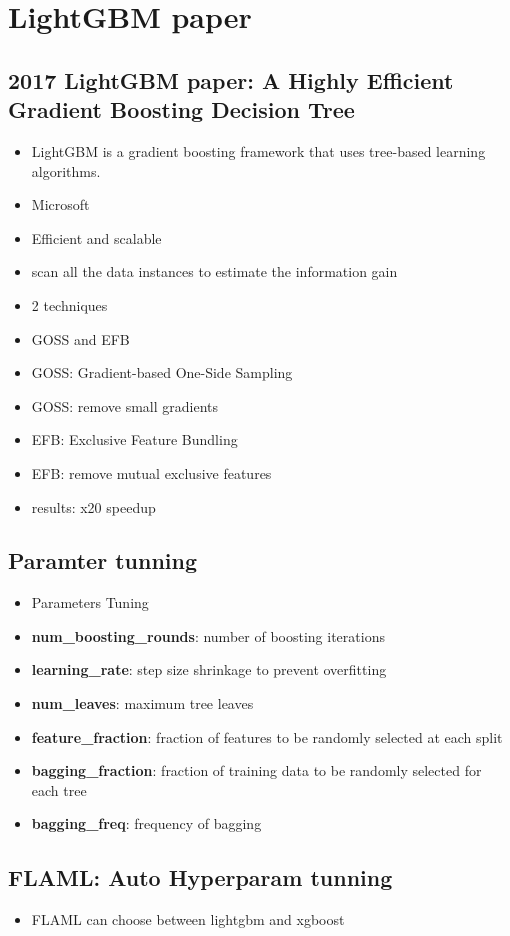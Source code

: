 \documentclass{paper}
\begin{document}

\section{LightGBM paper}
\subsection{2017 LightGBM paper: A Highly Efficient Gradient Boosting Decision Tree}
\begin{itemize}
\item LightGBM is a gradient boosting framework that uses tree-based learning algorithms.
\item Microsoft
\item Efficient and scalable
\item scan all the data instances to estimate the information gain
\item 2 techniques
\item GOSS and EFB
\item GOSS: Gradient-based One-Side Sampling
\item GOSS: remove small gradients
\item EFB: Exclusive Feature Bundling
\item EFB: remove mutual exclusive features
\item results: x20 speedup
\end{itemize}

\subsection{Paramter tunning}
\begin{itemize}
    \item Parameters Tuning
\item \textbf{num\_boosting\_rounds}: number of boosting iterations
\item \textbf{learning\_rate}: step size shrinkage to prevent overfitting
\item \textbf{num\_leaves}: maximum tree leaves
\item \textbf{feature\_fraction}: fraction of features to be randomly selected at each split
\item \textbf{bagging\_fraction}: fraction of training data to be randomly selected for each tree
\item \textbf{bagging\_freq}: frequency of bagging
\end{itemize}

\subsection{FLAML: Auto Hyperparam tunning}
\begin{itemize}
    \item FLAML can choose between lightgbm and xgboost
\end{itemize}
\end{document}
